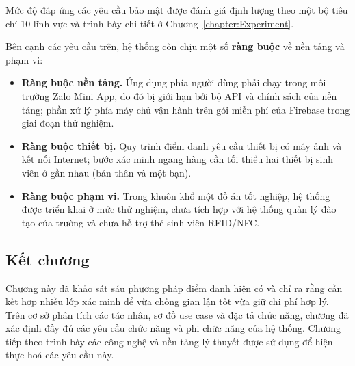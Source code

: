 \documentclass[../main.tex]{subfiles}
\begin{document}
Mức độ đáp ứng các yêu cầu bảo mật được đánh giá định lượng theo một bộ tiêu chí 10 lĩnh
vực và trình bày chi tiết ở Chương~\ref{chapter:Experiment}.

\bigskip
\noindent Bên cạnh các yêu cầu trên, hệ thống còn chịu một số \textbf{ràng buộc} về nền tảng
và phạm vi:

\begin{itemize}[leftmargin=1.5em]
  \item \textbf{Ràng buộc nền tảng.} Ứng dụng phía người dùng phải chạy trong môi trường
  Zalo Mini App, do đó bị giới hạn bởi bộ API và chính sách của nền tảng; phần xử lý phía
  máy chủ vận hành trên gói miễn phí của Firebase trong giai đoạn thử nghiệm.

  \item \textbf{Ràng buộc thiết bị.} Quy trình điểm danh yêu cầu thiết bị có máy ảnh và kết
  nối Internet; bước xác minh ngang hàng cần tối thiểu hai thiết bị sinh viên ở gần nhau (bản thân và một bạn).

  \item \textbf{Ràng buộc phạm vi.} Trong khuôn khổ một đồ án tốt nghiệp, hệ thống được
  triển khai ở mức thử nghiệm, chưa tích hợp với hệ thống quản lý đào tạo của trường và chưa
  hỗ trợ thẻ sinh viên RFID/NFC.
\end{itemize}

\subsection*{Kết chương}
Chương này đã khảo sát sáu phương pháp điểm danh hiện có và chỉ ra rằng cần kết hợp nhiều
lớp xác minh để vừa chống gian lận tốt vừa giữ chi phí hợp lý. Trên cơ sở phân tích các tác
nhân, sơ đồ use case và đặc tả chức năng, chương đã xác định đầy đủ các yêu cầu chức năng và
phi chức năng của hệ thống. Chương tiếp theo trình bày các công nghệ và nền tảng lý thuyết
được sử dụng để hiện thực hoá các yêu cầu này.
\end{document}

